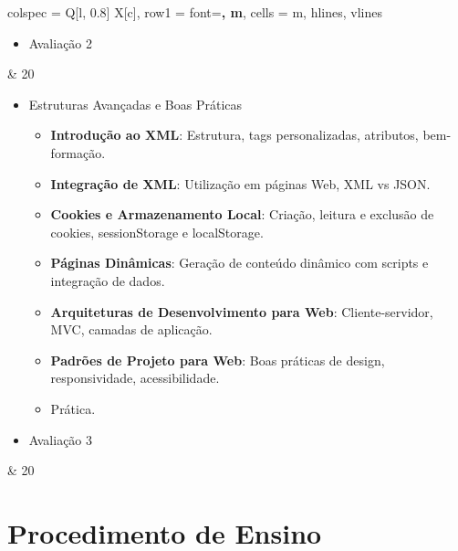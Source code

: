 \documentclass[a4paper, 12pt]{article}
\begin{document}
\begin{longtblr}{colspec = {Q[l, 0.8\textwidth] X[c]},
        row{1} = {font=\bfseries, m},
        cells = {m},
        hlines, vlines
        }
\begin{itemize}
\begin{itemize}
                \item \textbf{DHTML}: Conceitos, integração entre HTML, CSS e JavaScript para páginas dinâmicas.
                \item \textbf{Eventos em JavaScript}: onClick, onChange, onMouseOver, key events, timers.
                \item \textbf{Validação de Formulários com JavaScript}: Boas práticas, mensagens de erro, regex.
                \item Prática.
            \end{itemize}
        \item Avaliação 2
    \end{itemize} & 20\\
    \begin{itemize}
        \item Estruturas Avançadas e Boas Práticas
            \begin{itemize}
                \item \textbf{Introdução ao XML}: Estrutura, tags personalizadas, atributos, bem-formação.
                \item \textbf{Integração de XML}: Utilização em páginas Web, XML vs JSON.
                \item \textbf{Cookies e Armazenamento Local}: Criação, leitura e exclusão de cookies, sessionStorage e localStorage.
                \item \textbf{Páginas Dinâmicas}: Geração de conteúdo dinâmico com scripts e integração de dados.
                \item \textbf{Arquiteturas de Desenvolvimento para Web}: Cliente-servidor, MVC, camadas de aplicação.
                \item \textbf{Padrões de Projeto para Web}: Boas práticas de design, responsividade, acessibilidade.
                \item Prática.
            \end{itemize}
        \item Avaliação 3
    \end{itemize} & 20\\
\end{longtblr}

\section{Procedimento de Ensino}
\end{document}
